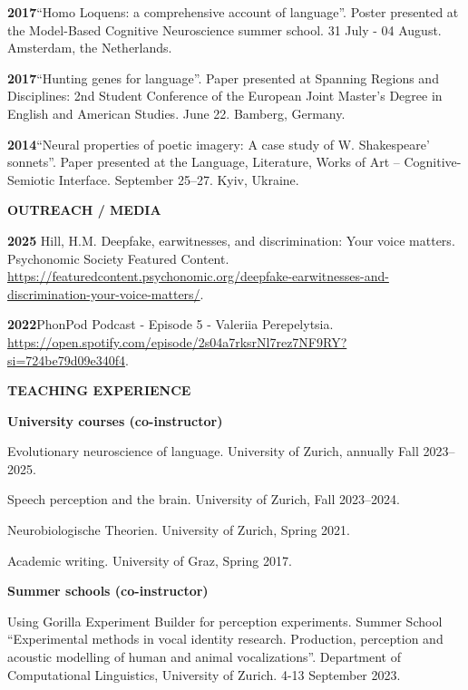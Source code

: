 \documentclass[11pt]{article}
\newcommand{\hangpara}{
 \setlength{\parindent}{0in} %
 \hangindent=0.42in %
}
\begin{document}
\vskip 6pt
\hangpara
{\bf 2017}\hspace{1ex}“Homo Loquens: a comprehensive account of language”. Poster presented at the Model-Based Cognitive Neuroscience summer school. 31 July - 04 August. Amsterdam, the Netherlands.


\vskip 6pt
\hangpara
{\bf 2017}\hspace{1ex}“Hunting genes for language”. Paper presented at Spanning Regions and Disciplines: 2nd Student Conference of the European Joint Master's Degree in English and American Studies. June 22. Bamberg, Germany.


\vskip 6pt
\hangpara
{\bf 2014}\hspace{1ex}“Neural properties of poetic imagery: A case study of W. Shakespeare’ sonnets”. Paper presented at the Language, Literature, Works of Art – Cognitive-Semiotic Interface. September 25--27. Kyiv, Ukraine.


\vskip 20pt
\begin{flushleft}
{\bf OUTREACH / MEDIA}
\end{flushleft}

\hangpara
{\bf 2025}\hspace{1ex} Hill, H.M. Deepfake, earwitnesses, and discrimination: Your voice matters. Psychonomic Society Featured Content. \url{https://featuredcontent.psychonomic.org/deepfake-earwitnesses-and-discrimination-your-voice-matters/}.

\hangpara
{\bf 2022}\hspace{1ex}PhonPod Podcast - Episode 5 - Valeriia Perepelytsia. \url{https://open.spotify.com/episode/2s04a7rksrNl7rez7NF9RY?si=724be79d09e340f4}.



\vskip 20pt
\begin{flushleft}
{\bf TEACHING EXPERIENCE}
\end{flushleft}
\begin{flushleft}
{\bf University courses (co-instructor)}
\end{flushleft}
\hangpara Evolutionary neuroscience of language. University of Zurich, annually Fall 2023--2025.
\vskip 6pt
\hangpara Speech perception and the brain. University of Zurich, Fall 2023--2024.
\vskip 6pt
\hangpara Neurobiologische Theorien. University of Zurich, Spring 2021.
\hangpara Academic writing. University of Graz, Spring 2017.




\begin{flushleft}
{\bf Summer schools (co-instructor)}
\end{flushleft}
\hangpara Using Gorilla Experiment Builder for perception experiments. Summer School “Experimental methods in vocal identity research. Production, perception and acoustic modelling of human and animal vocalizations”. Department of Computational Linguistics, University of Zurich. 4-13 September 2023.
\end{document}
